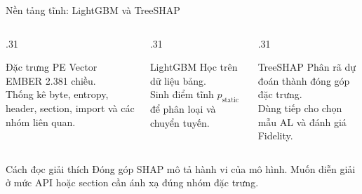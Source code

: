 \documentclass[aspectratio=169,10pt]{beamer}
\begin{document}
\begin{frame}{Nền tảng tĩnh: LightGBM và TreeSHAP}
\begin{columns}[T,onlytextwidth]
  \begin{column}{.31\textwidth}
    \begin{block}{Đặc trưng PE}
      Vector EMBER 2.381 chiều.\\[.16cm]
      Thống kê byte, entropy, header, section, import và các nhóm liên quan.
    \end{block}
  \end{column}
  \begin{column}{.31\textwidth}
    \begin{block}{LightGBM}
      Học trên dữ liệu bảng.\\[.16cm]
      Sinh điểm tĩnh $p_{\mathrm{static}}$ để phân loại và chuyển tuyến.
    \end{block}
  \end{column}
  \begin{column}{.31\textwidth}
    \begin{block}{TreeSHAP}
      Phân rã dự đoán thành đóng góp đặc trưng.\\[.16cm]
      Dùng tiếp cho chọn mẫu AL và đánh giá Fidelity.
    \end{block}
  \end{column}
\end{columns}
\vspace{.25cm}
\begin{block}{Cách đọc giải thích}
Đóng góp SHAP mô tả hành vi của mô hình. Muốn diễn giải ở mức API hoặc section cần ánh xạ đúng nhóm đặc trưng.
\end{block}
\end{frame}
\end{document}
